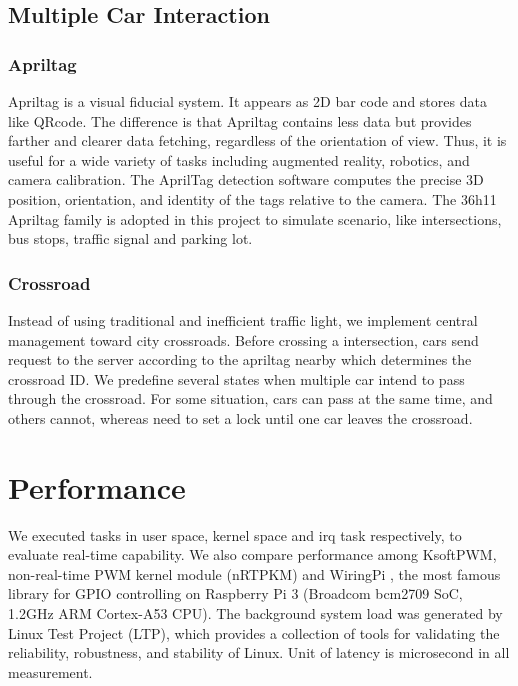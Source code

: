 \documentclass[conference]{IEEEtran}
\begin{document}
\subsection{Multiple Car Interaction}

\subsubsection{Apriltag}

Apriltag is a visual fiducial system. It appears as 2D bar code and stores data like QRcode. The difference is that Apriltag contains less data but provides farther and clearer data fetching, regardless of the orientation of view. Thus, it is useful for a wide variety of tasks including augmented reality, robotics, and camera calibration. The AprilTag detection software computes the precise 3D position, orientation, and identity of the tags relative to the camera. The 36h11 Apriltag family is adopted in this project to simulate scenario, like intersections, bus stops, traffic signal and parking lot.

\subsubsection{Crossroad}

Instead of using traditional and inefficient traffic light, we implement central management toward city crossroads. Before crossing a intersection, cars send request to the server according to the apriltag nearby which determines the crossroad ID. We predefine several states when multiple car intend to pass through the crossroad. For some situation, cars can pass at the same time, and others cannot, whereas need to set a lock until one car leaves the crossroad.

\section{Performance}

We executed tasks in user space, kernel space and irq task respectively, to evaluate real-time capability. We also compare performance among KsoftPWM, non-real-time PWM kernel module (nRTPKM) and WiringPi \cite{WiringPi}, the most famous library for GPIO controlling on Raspberry Pi 3 (Broadcom bcm2709 SoC, 1.2GHz ARM Cortex-A53 CPU). The background system load was generated by Linux Test Project (LTP), which provides a collection of tools for validating the reliability, robustness, and stability of Linux. Unit of latency is microsecond in all measurement.
\end{document}
